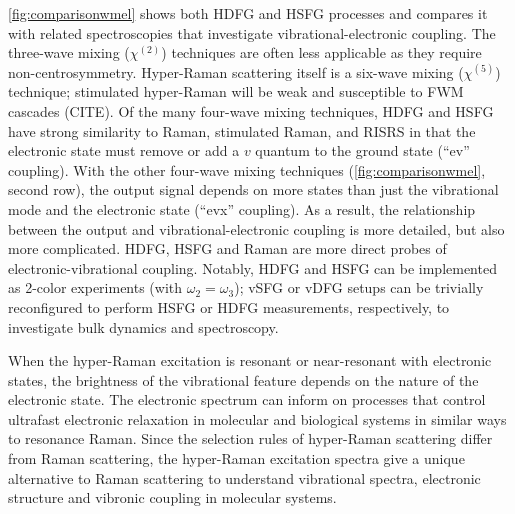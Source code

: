 \documentclass[aip, jcp, reprint, onecolumn]{revtex4-2}
\begin{document}
\autoref{fig:comparisonwmel} shows both HDFG and HSFG processes and compares it with related spectroscopies that investigate vibrational-electronic coupling.
The three-wave mixing ($\chi^{(2)}$) techniques are often less applicable as they require non-centrosymmetry.
Hyper-Raman scattering itself is a six-wave mixing ($\chi^{(5)}$) technique; stimulated hyper-Raman will be weak and susceptible to FWM cascades (CITE).
Of the many four-wave mixing techniques, HDFG and HSFG have strong similarity to Raman, stimulated Raman, and RISRS in that the electronic state must remove or add a $v$ quantum to the ground state (``ev'' coupling).
With the other four-wave mixing techniques (\autoref{fig:comparisonwmel}, second row), the output signal depends on more states than just the vibrational mode and the electronic state (``evx'' coupling). 
As a result, the relationship between the output and vibrational-electronic coupling is more detailed, but also more complicated.
HDFG, HSFG and Raman are more direct probes of electronic-vibrational coupling.
Notably, HDFG and HSFG can be implemented as 2-color experiments (with $\omega_2=\omega_3$); vSFG or vDFG setups can be trivially reconfigured to perform HSFG or HDFG measurements, respectively, to investigate bulk dynamics and spectroscopy.

When the hyper-Raman excitation is resonant or near-resonant with electronic states, the brightness of the vibrational feature depends on the nature of the electronic state.
The electronic spectrum can inform on processes that control ultrafast electronic relaxation in molecular and biological systems in similar ways to resonance Raman.\cite{Bredenbeck2015, Arsenault2021}
Since the selection rules of hyper-Raman scattering differ from Raman scattering, the hyper-Raman excitation spectra give a unique alternative to Raman scattering to understand vibrational spectra, electronic structure and vibronic coupling in molecular systems. \cite{Olson2018}

\end{document}
